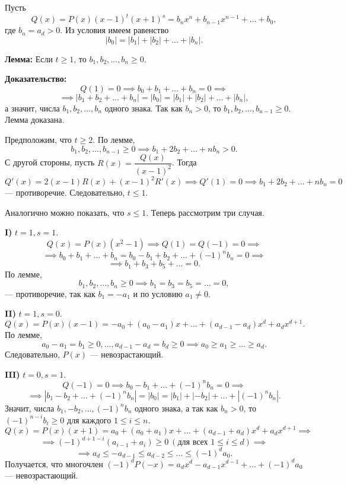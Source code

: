 \documentclass[12pt]{article}
\begin{document}
Пусть
\[Q(x) = P(x) (x-1)^t (x+1)^s = b_n x^n + b_{n-1} x^{n-1} + \ldots + b_0,\]
где $b_n = a_d > 0$. Из условия имеем равенство 
\[|b_0 |=|b_1| + |b_2| + \ldots + |b_n|.\]

\textbf{Лемма:} Если $t \geq 1$, то $b_1, b_2, \ldots, b_n \geq 0$.

\textbf{Доказательство:} 
\[Q(1) = 0 \implies b_0 + b_1 + \ldots + b_n = 0 \implies\] 
\[\implies |b_1 + b_2 + \ldots + b_n| = |b_0| = |b_1| + |b_2| + \ldots + |b_n|,\]
а значит, числа $b_1, b_2, \ldots, b_n$ одного знака. Так как $b_n > 0$, то $b_1, b_2, \ldots, b_{n-1} \geq 0$. Лемма доказана.

Предположим, что $t \geq 2$. По лемме,
\[b_1, b_2, \ldots, b_{n-1} \geq 0 \implies b_1 + 2b_2 + \ldots + nb_n > 0.\] 
С другой стороны, пусть $R(x) = \dfrac{Q(x)}{(x - 1)^2}$. Тогда
\[Q'(x) = 2(x - 1) R(x) + (x - 1)^2 R'(x) \implies Q'(1) = 0 \implies b_1 + 2b_2 + \ldots + nb_n = 0\]
--- противоречие. Следовательно, $t \leq 1$.

Аналогично можно показать, что $s \leq 1$. Теперь рассмотрим три случая.

\textbf{I)} $t = 1, s = 1$. 
\[Q(x) = P(x) (x^2 - 1) \implies Q(1) = Q(-1) = 0 \implies \]
\[\implies b_0 + b_1 + \ldots + b_n = b_0 - b_1 + b_2 + \ldots + {(-1)^n} b_n = 0 \implies\]
\[\implies b_1 + b_3 + b_5 + \ldots = 0.\]
По лемме,
\[b_1, b_2, \ldots, b_n \geq 0 \implies b_1 = b_3 = b_5 = \ldots = 0,\]
--- противоречие, так как $b_1 = -a_1$ и по условию $a_1 \ne 0$. 

\textbf{II)} $t = 1, s = 0$.
\[Q(x) = P(x)(x-1) = -a_0 + (a_0 - a_1 ) x + \ldots + (a_{d-1} - a_d) x^d + a_d x^{d+1}.\]
По лемме,
\[a_0 - a_1 = b_1 \geq 0, \ldots, a_{d-1} - a_d = b_d \geq 0 \implies a_0 \geq a_1 \geq \ldots \geq a_d.\]
Следовательно, $P(x)$ --- невозрастающий.

\textbf{III)} $t = 0, s = 1$.
\[Q(-1) = 0 \implies b_0 - b_1 + \ldots + (-1)^n b_n = 0 \implies\]
\[\implies |b_1 - b_2 + \ldots + (-1)^n b_n| = |b_0| = |b_1| + |-b_2| + \ldots + |(-1)^n b_n|.\]
Значит, числа $b_1, -b_2, \ldots, (-1)^n b_n$ одного знака, а так как $b_n > 0$, то $(-1)^{n-i} b_i \geq 0$ для каждого $1 \leq i \leq n$. 
\[Q(x) = P(x)(x+1) = a_0 + (a_0 + a_1) x + \ldots + (a_{d-1} + a_d) x^d + a_d x^{d+1} \implies\]
\[\implies (-1)^{d+1-i} (a_{i-1} + a_i) \geq 0 \ (\text{для всех } 1 \leq i \leq d) \implies\]
\[\implies a_d \leq -a_{d-1} \leq a_{d-2} \leq \ldots \leq (-1)^d a_0.\]
Получается, что многочлен $(-1)^d P(-x) = a_d x^d - a_{d-1} x^{d-1} + \ldots + (-1)^d a_0$ --- невозрастающий.
\end{document}
